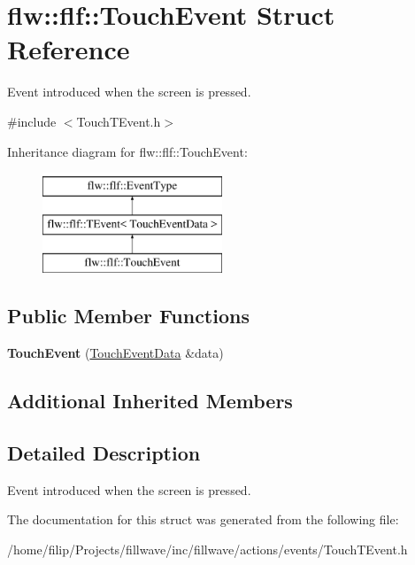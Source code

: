 \hypertarget{classflw_1_1flf_1_1TouchEvent}{}\section{flw\+:\+:flf\+:\+:Touch\+Event Struct Reference}
\label{classflw_1_1flf_1_1TouchEvent}


Event introduced when the screen is pressed.  




{\ttfamily \#include $<$Touch\+T\+Event.\+h$>$}

Inheritance diagram for flw\+:\+:flf\+:\+:Touch\+Event\+:\begin{figure}[H]
\begin{center}
\leavevmode
\includegraphics[height=3.000000cm]{classflw_1_1flf_1_1TouchEvent}
\end{center}
\end{figure}
\subsection*{Public Member Functions}
\begin{DoxyCompactItemize}
\item 
{\bfseries Touch\+Event} (\hyperlink{structflw_1_1flf_1_1TouchEventData}{Touch\+Event\+Data} \&data)\hypertarget{classflw_1_1flf_1_1TouchEvent_aa07c4fbc9da1420f73de9d4241652387}{}\label{classflw_1_1flf_1_1TouchEvent_aa07c4fbc9da1420f73de9d4241652387}

\end{DoxyCompactItemize}
\subsection*{Additional Inherited Members}


\subsection{Detailed Description}
Event introduced when the screen is pressed. 

The documentation for this struct was generated from the following file\+:\begin{DoxyCompactItemize}
\item 
/home/filip/\+Projects/fillwave/inc/fillwave/actions/events/Touch\+T\+Event.\+h\end{DoxyCompactItemize}
